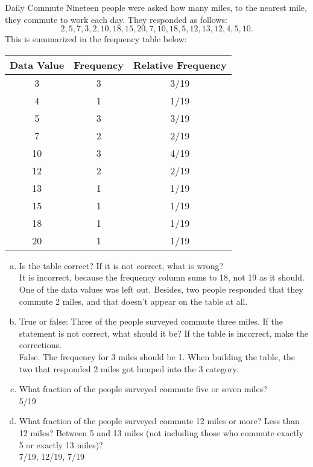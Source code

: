 \begin{example}[https://www.youtube.com/watch?v=VQhKtct3nog&list=PLfmpjsIzhzttL_Uec2nCbDRcAcUF7NKG8&index=7]{Daily Commute}
Nineteen people were asked how many miles, to the nearest mile, they commute to work each day. They responded as follows: \[2, 5, 7, 3, 2, 10, 18, 15, 20, 7, 10, 18, 5, 12, 13, 12, 4, 5, 10.\] This is summarized in the frequency table below:

\begin{center}
\begin{tabular}{c | c | c}
\textbf{Data Value} & \textbf{Frequency} & \textbf{Relative Frequency}\\
\hline
3 & 3 & 3/19 \\
4 & 1 & 1/19 \\
5 & 3 & 3/19 \\
7 & 2 & 2/19 \\
10 & 3 & 4/19 \\
12 & 2 & 2/19 \\
13 & 1 & 1/19 \\
15 & 1 & 1/19 \\
18 & 1 & 1/19 \\
20 & 1 & 1/19  
\end{tabular}
\end{center}

\begin{enumerate}[(a)]
\item Is the table correct? If it is not correct, what is wrong?\\

It is incorrect, because the frequency column sums to 18, not 19 as it should.  One of the data values was left out.  Besides, two people responded that they commute 2 miles, and that doesn't appear on the table at all.\\

\item True or false: Three of the people surveyed commute three miles. If the statement is not correct, what should it be? If the table is incorrect, make the corrections.\\

False.  The frequency for 3 miles should be 1.  When building the table, the two that responded 2 miles got lumped into the 3 category.\\

\item What fraction of the people surveyed commute five or seven miles?\\

5/19\\

\item What fraction of the people surveyed commute 12 miles or more? Less than 12 miles? Between 5 and 13 miles (not including those who commute exactly 5 or exactly 13 miles)?\\

7/19, 12/19, 7/19
\end{enumerate}
\end{example}
\pagebreak
\text{}
\vfill

